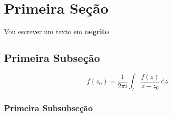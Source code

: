 
\section{Primeira Seção} %

  Vou escrever um texto em \textbf{negrito} 

  \subsection{Primeira Subseção} %
    \lipsum[1]
    \[
      f(z_0) = \frac{1}{2\pi i} \int_{\Gamma} \frac{f(z)}{z - z_0}\,\textrm{d}z
    \]
	  \subsubsection{Primeira Subsubseção} %
      \lipsum[1-4]